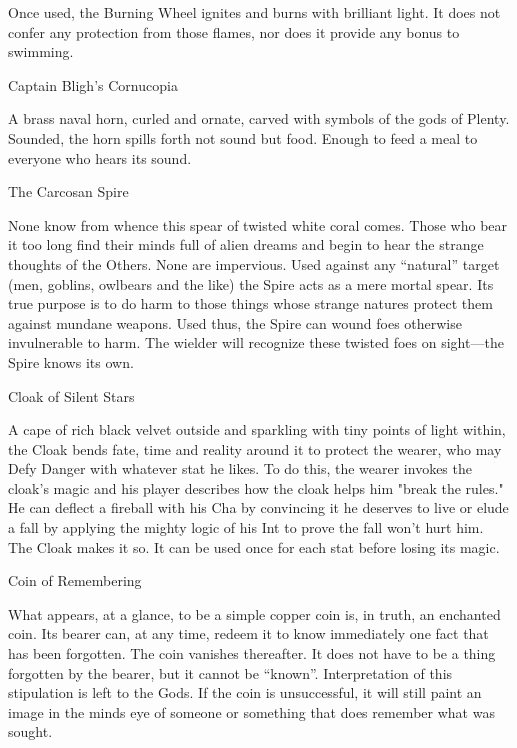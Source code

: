  

Once used, the Burning Wheel ignites and burns with brilliant light. It does not confer any protection from those flames, nor does it provide any bonus to swimming.

 

Captain Bligh's Cornucopia	 

 

A brass naval horn, curled and ornate, carved with symbols of the gods of Plenty.  Sounded, the horn spills forth not sound but food.  Enough to feed a meal to everyone who hears its sound.

 

The Carcosan Spire	 

 

None know from whence this spear of twisted white coral comes. Those who bear it too long find their minds full of alien dreams and begin to hear the strange thoughts of the Others. None are impervious. Used against any “natural” target (men, goblins, owlbears and the like) the Spire acts as a mere mortal spear. Its true purpose is to do harm to those things whose strange natures protect them against mundane weapons. Used thus, the Spire can wound foes otherwise invulnerable to harm. The wielder will recognize these twisted foes on sight—the Spire knows its own.

 

Cloak of Silent Stars	 

 

A cape of rich black velvet outside and sparkling with tiny points of light within, the Cloak bends fate, time and reality around it to protect the wearer, who may Defy Danger with whatever stat he likes. To do this, the wearer invokes the cloak’s magic and his player describes how the cloak helps him "break the rules." He can deflect a fireball with his Cha by convincing it he deserves to live or elude a fall by applying the mighty logic of his Int to prove the fall won’t hurt him. The Cloak makes it so. It can be used once for each stat before losing its magic.

 

Coin of Remembering	 

 

What appears, at a glance, to be a simple copper coin is, in truth, an enchanted coin. Its bearer can, at any time, redeem it to know immediately one fact that has been forgotten. The coin vanishes thereafter. It does not have to be a thing forgotten by the bearer, but it cannot be “known”. Interpretation of this stipulation is left to the Gods. If the coin is unsuccessful, it will still paint an image in the minds eye of someone or something that does remember what was sought.


